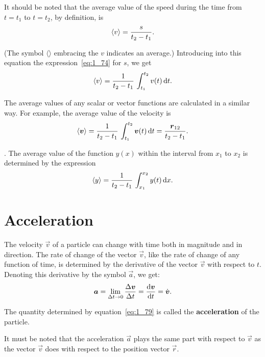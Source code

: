 It should be noted that the average value of the speed during
the time from $t = t_1$ to $t = t_2$, by definition, is
\begin{equation*}
\left\langle v \right\rangle = \frac{s}{t_2-t_1}.
\end{equation*}

\noindent
(The symbol $\langle\rangle$ embracing the $v$ indicates an average.) Introducing into this equation the expression~\eqref{eq:1_74} for $s$, we get
\begin{equation}\label{eq:1_76}
\left\langle v \right\rangle = \frac{1}{t_2-t_1}\,\int_{t_1}^{t_2}v(t)\,\mathrm{d}t.
\end{equation}

\noindent
The average values of any scalar or vector functions are calculated in a similar way. For example, the average value of the velocity is
\begin{equation}\label{eq:1_77}
\left\langle \boldsymbol{v} \right\rangle = \frac{1}{t_2-t_1}\,\int_{t_1}^{t_2}\boldsymbol{v}(t)\,\mathrm{d}t = \frac{\boldsymbol{r}_{12}}{t_2-t_1}.
\end{equation}

. The average value of the function $y(x)$ within the interval from $x_1$ to $x_2$ is determined by the expression
\begin{equation}\label{eq:1_78}
\left\langle y \right\rangle = \frac{1}{t_2-t_1}\,\int_{x_1}^{x_2}y(t)\,\mathrm{d}x.
\end{equation}

\section{Acceleration}\label{sec:1_4}

The velocity $\vec{v}$ of a particle can change with time both in magnitude and in direction. The rate of change of the vector $\vec{v}$, like the rate of change of any function of time, is determined by the derivative of the vector $\vec{v}$ with respect to $t$. Denoting this derivative by the symbol $\vec{a}$, we get:
\begin{equation}\label{eq:1_79}
\boldsymbol{a} = \lim_{\Delta t\to 0}\frac{\Delta\boldsymbol{v}}{\Delta t} = \frac{\mathrm{d}\boldsymbol{v}}{\mathrm{d} t} = \dot{\boldsymbol{v}}.
\end{equation}

\noindent
The quantity determined by equation~\eqref{eq:1_79} is called the \textbf{acceleration} of the particle.

It must be noted that the acceleration $\vec{a}$ plays the same part with respect to $\vec{v}$ as the vector $\vec{v}$ does with respect to the position vector $\vec{r}$.

